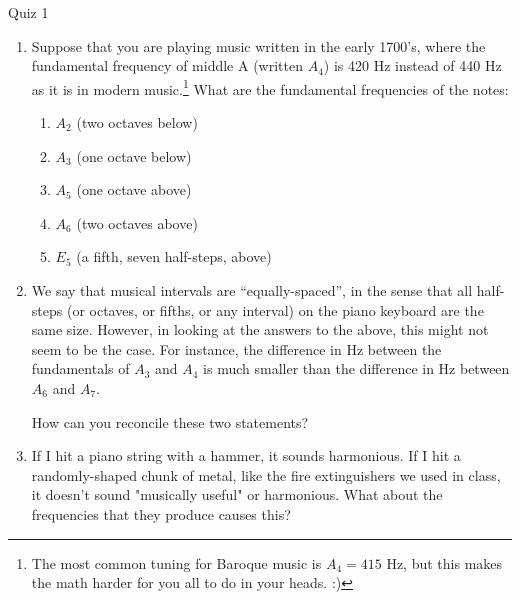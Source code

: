\documentclass[10pt]{article}
\newcommand{\vsi}{\vspace{1in}}
\newcommand{\vshi}{\vspace{0.5in}}
\begin{document}
\begin{center} \sc \Large Quiz 1\end{center}

  \begin{enumerate}
    \item Suppose that you are playing music written in the early 1700's, where the fundamental frequency of middle A (written $A_4$) is 420 Hz instead of 440 Hz as it is in modern
      music.\footnote{The most common tuning for Baroque music is $A_4 = 415$ Hz, but this makes the math harder for you all to do in your heads. :)}  What are the fundamental frequencies of the notes:

      \begin{enumerate}
	\item $A_2$ (two octaves below)
	  \vshi
	\item $A_3$ (one octave below)
	  \vshi

	\item $A_5$ (one octave above)
	  \vshi

	\item $A_6$ (two octaves above)
	  \vshi

	\item $E_5$ (a fifth, seven half-steps, above)
	  \vshi

      \end{enumerate}

    \item We say that musical intervals are ``equally-spaced'', in the sense that all half-steps (or octaves, or fifths, or any interval) on the piano keyboard
      are the same size. However, in looking at the answers to the above, this might not seem to be the case. For instance, the difference in Hz between the fundamentals of 
      $A_3$ and $A_4$ is much smaller than the difference in Hz between $A_6$ and $A_7$. 

      How can you reconcile these two statements?

\vsi

    \item If I hit a piano string with a hammer, it sounds harmonious. If I hit a randomly-shaped chunk of metal, like the fire extinguishers we used in class, it doesn't sound
      "musically useful" or harmonious. What about the frequencies that they produce causes this?

  \end{enumerate}
\end{document}
